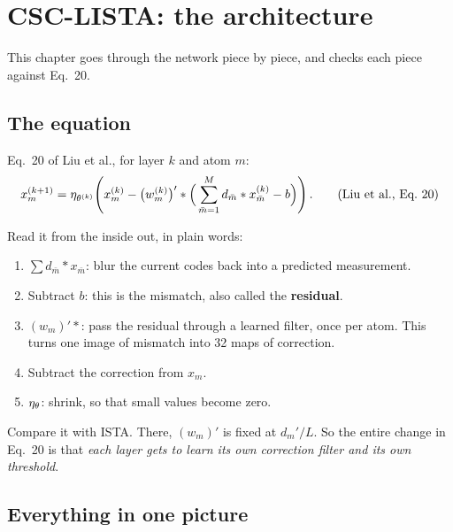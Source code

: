 \chapter{CSC-LISTA: the architecture}\label{ch:csc_lista}

This chapter goes through the network piece by piece, and checks each piece against Eq.~20.

\section{The equation}

Eq.~20 of Liu et al., for layer $k$ and atom $m$:
\begin{equation}
x_m^{(k+1)} = \eta_{\theta^{(k)}}\!\left( x_m^{(k)} - \big(w_m^{(k)}\big)' *
\Big( \sum_{\bar m=1}^{M} d_{\bar m} * x_{\bar m}^{(k)} - b \Big) \right). \tag{Liu et al., Eq.~20}
\end{equation}

Read it from the inside out, in plain words:

\begin{enumerate}
\item $\sum d_{\bar m}*x_{\bar m}$: blur the current codes back into a predicted measurement.
\item Subtract $b$: this is the mismatch, also called the \textbf{residual}.
\item $(w_m)'*$: pass the residual through a learned filter, once per atom. This turns one image of
mismatch into 32 maps of correction.
\item Subtract the correction from $x_m$.
\item $\eta_\theta$: shrink, so that small values become zero.
\end{enumerate}

Compare it with ISTA. There, $(w_m)'$ is fixed at $d_m'/L$. So the entire change in Eq.~20 is that
\emph{each layer gets to learn its own correction filter and its own threshold}.

\section{Everything in one picture}

